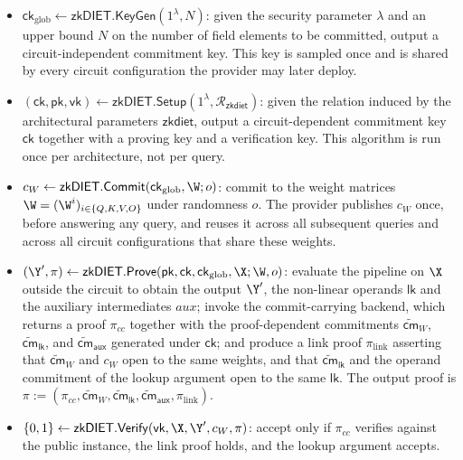 \begin{itemize} [leftmargin=3mm, itemsep=2pt, topsep=2pt]
  \item $\mathsf{ck}_{\mathrm{glob}} \leftarrow \mathsf{zkDIET}.\mathsf{KeyGen}(1^{\lambda}, N)$:
        given the security parameter $\lambda$ and an upper bound $N$ on the number of field elements to be committed, output a circuit-independent commitment key. This key is sampled once and is shared by every circuit configuration the provider may later deploy.

  \item $(\mathsf{ck}, \mathsf{pk}, \mathsf{vk}) \leftarrow
        \mathsf{zkDIET}.\mathsf{Setup}(1^{\lambda}, \mathcal{R}_{\mathsf{zkdiet}})$:
        given the relation induced by the architectural parameters $\mathsf{zkdiet}$, output a circuit-dependent commitment key $\mathsf{ck}$ together with a proving key and a verification key. This algorithm is run once per architecture, not per query.

  \item $c_{W} \leftarrow
        \mathsf{zkDIET}.\mathsf{Commit}(\mathsf{ck}_{\mathrm{glob}}, \W; o)$:
        commit to the weight matrices $\W = (\W^{i})_{i \in \{Q,K,V,O\}}$ under randomness $o$. The provider publishes $c_{W}$ once, before answering any query, and reuses it across all subsequent queries and across all circuit configurations that share these weights.

  \item $(\Y', \pi) \leftarrow \mathsf{zkDIET}.\mathsf{Prove} (\mathsf{pk}, \mathsf{ck}, \mathsf{ck}_{\mathrm{glob}}, \X; \W, o)$:
        evaluate the pipeline on $\X$ outside the circuit to obtain the output $\Y'$, the non-linear operands $\mathsf{lk}$ and the auxiliary intermediates $\textit{aux}$; invoke the commit-carrying backend, which returns a proof $\pi_{cc}$ together with the proof-dependent commitments $\widetilde{\mathsf{cm}}_{W}$, $\widetilde{\mathsf{cm}}_{\mathsf{lk}}$, and $\widetilde{\mathsf{cm}}_{\mathsf{aux}}$ generated under $\mathsf{ck}$; and produce a link proof $\pi_{\mathrm{link}}$ asserting that $\widetilde{\mathsf{cm}}_{W}$ and $c_{W}$ open to the
        same weights, and that $\widetilde{\mathsf{cm}}_{\mathsf{lk}}$ and the operand commitment of the lookup argument open to the same $\mathsf{lk}$. The output
        proof is $\pi := (\pi_{cc}, \widetilde{\mathsf{cm}}_{W}, \widetilde{\mathsf{cm}}_{\mathsf{lk}}, \widetilde{\mathsf{cm}}_{\mathsf{aux}}, \pi_{\mathrm{link}})$.

  \item $\{0,1\} \leftarrow \mathsf{zkDIET}.\mathsf{Verify}(\mathsf{vk}, \X, \Y', c_{W}, \pi)$:
        accept only if $\pi_{cc}$ verifies against the public instance, the link proof holds, and the lookup argument accepts.
\end{itemize}

